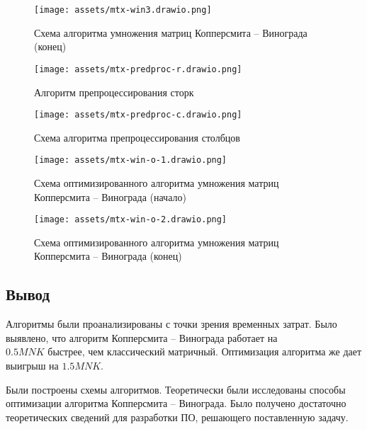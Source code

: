 \begin{figure}[H]
	\centering
	\texttt{[image: assets/mtx-win3.drawio.png]}
	\caption{Схема алгоритма умножения матриц Копперсмита -- Винограда (конец)}
	\label{fig:win-3}
\end{figure}

\begin{figure}[H]
	\centering
	\texttt{[image: assets/mtx-predproc-r.drawio.png]}
	\caption{Алгоритм препроцессирования сторк}
	\label{fig:prep-r}
\end{figure}

\begin{figure}[H]
	\centering
	\texttt{[image: assets/mtx-predproc-c.drawio.png]}
	\caption{Схема алгоритма препроцессирования столбцов}
	\label{fig:prep-c}
\end{figure}

\begin{figure}[H]
	\centering
	\texttt{[image: assets/mtx-win-o-1.drawio.png]}
	\caption{Схема оптимизированного алгоритма умножения матриц Копперсмита -- Винограда (начало)}
	\label{fig:win-o-1}
\end{figure}

\begin{figure}[H]
	\centering
	\texttt{[image: assets/mtx-win-o-2.drawio.png]}
	\caption{Схема оптимизированного алгоритма умножения матриц Копперсмита -- Винограда (конец)}
	\label{fig:win-o-2}
\end{figure}

\subsection{Вывод}
Алгоритмы были проанализированы с точки зрения временных затрат. Было выявлено, что алгоритм Копперсмита -- Винограда работает на \\ $0.5MNK$ быстрее, чем классический матричный. Оптимизация алгоритма же дает выигрыш на $1.5MNK$. 


Были построены схемы алгоритмов. Теоретически были исследованы способы оптимизации алгоритма Копперсмита -- Винограда. Было получено достаточно теоретических сведений для разработки ПО, решающего поставленную задачу.